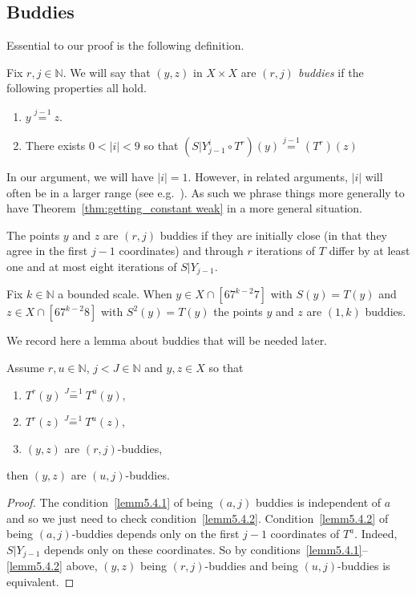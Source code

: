 \documentclass[AHL,Unicode,longabstracts,published]{cedram}
\newcommand{\N}{\mathbb{N}}
\begin{document}
\subsection{Buddies}\label{subsec:buddies}

Essential to our proof is the following definition.

\begin{defi}[Buddies]\label{def:weak_friends}
Fix $r,j \in \N$. We will say that $(y,z)$ in $X \times X$ are
\emph{$(r,j)$ buddies} if the following properties all hold.
\begin{enumerate}
\item\label{cond:start same 2}
$y \overset{j-1}{=} z$.
\item\label{cond:differ by 1}
There exists $0 < |i| <9$ so that $(S|Y_{j-1}^i \circ T^r)(y) \overset{j-1}{=} (T^r)(z)$
\end{enumerate}
\end{defi}

\begin{rema}
In our argument, we will have $|i|=1$. However, in related arguments, $|i|$ will often be in a larger range (see e.g.~\cite{MR4251942}). As such we phrase things more generally to have Theorem~\ref{thm:getting_constant weak} in a more general situation.
\end{rema}


The points $y$ and $z$ are $(r,j)$ buddies if they are initially close (in that they agree in the first $j-1$ coordinates) and through $r$ iterations of $T$ differ by at least one and at most eight iterations of $S|Y_{j-1}$.

\begin{exam}
Fix $k \in \N$ a bounded scale. When $y \in X \cap [6 7^{k-2} 7]$ with $S(y) = T(y)$ and $z \in X \cap [6 7^{k-2}8]$ with $S^2(y) = T(y)$ the points $y$ and $z$ are $(1,k)$ buddies.
\end{exam}


We record here a lemma about buddies that will be needed later.

\begin{lemm}\label{lem:buddies through reduc}
Assume $r,u\in \N$, $j<J\in \N$ and $y,z\in X$ so that
\begin{enumerate}
\item\label{lemm5.4.1} $T^r(y) \overset{J-1}{=} T^u(y)$,
\item\label{lemm5.4.2} $T^r(z) \overset{J-1}{=} T^u(z)$,
\item\label{lemm5.4.3} $(y,z)$ are $(r,j)$-buddies,
\end{enumerate}
then $(y,z)$ are $(u,j)$-buddies.
\end{lemm}
\begin{proof}
The condition~\eqref{lemm5.4.1} of being $(a,j)$ buddies is independent of $a$ and so we just need to check condition~\eqref{lemm5.4.2}. Condition~\eqref{lemm5.4.2} of being $(a,j)$-buddies depends only on the first $j-1$ coordinates of $T^a$. Indeed, $S|Y_{j-1}$ depends only on these coordinates. So by conditions~\eqref{lemm5.4.1}--\eqref{lemm5.4.2} above, $(y,z)$ being $(r,j)$-buddies and being $(u,j)$-buddies is equivalent.
\end{proof}
\end{document}
